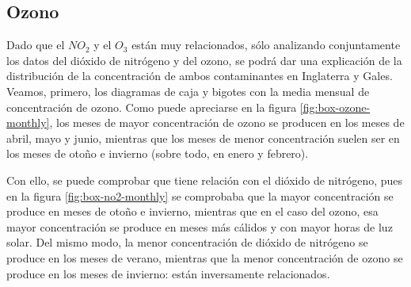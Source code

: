 \documentclass[12pt]{article}
\begin{document}
\subsection{Ozono}

Dado que el $NO_{2}$ y el $O_{3}$ están muy relacionados, sólo analizando conjuntamente los datos del dióxido de nitrógeno y del ozono, se podrá dar una explicación de la distribución de la concentración de ambos contaminantes en Inglaterra y Gales. Veamos, primero, los diagramas de caja y bigotes con la media mensual de concentración de ozono. Como puede apreciarse en la figura \ref{fig:box-ozone-monthly}, los meses de mayor concentración de ozono se producen en los meses de abril, mayo y junio, mientras que los meses de menor concentración suelen ser en los meses de otoño e invierno (sobre todo, en enero y febrero).

Con ello, se puede comprobar que tiene relación con el dióxido de nitrógeno, pues en la figura \ref{fig:box-no2-monthly} se comprobaba que la mayor concentración se produce en meses de otoño e invierno, mientras que en el caso del ozono, esa mayor concentración se produce en meses más cálidos y con mayor horas de luz solar. Del mismo modo, la menor concentración de dióxido de nitrógeno se produce en los meses de verano, mientras que la menor concentración de ozono se produce en los meses de invierno: están inversamente relacionados.
\end{document}
